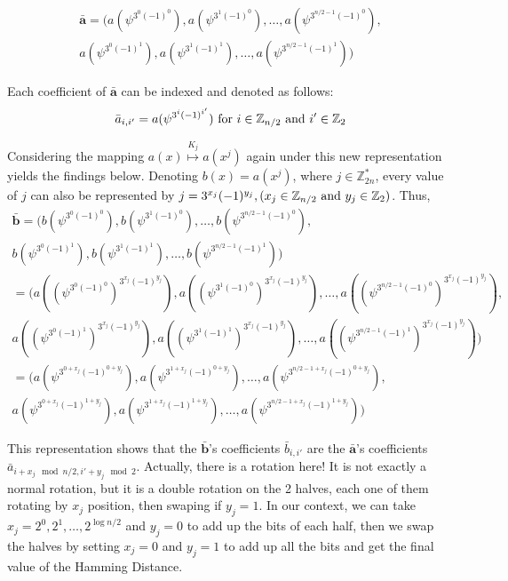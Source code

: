 \begin{description}
  \begin{align*}
       \mathbf{\bar{a}} = (a(\psi^{3^{0}(-1)^{0}}),a(\psi^{3^{1}(-1)^{0}}), \dots,
    a(\psi^{3^{n/2 -1}(-1)^{0}}), \\ a(\psi^{3^{0}(-1)^{1}}),
    a(\psi^{3^{1}(-1)^{1}}), \dots,a(\psi^{3^{n/2 -1}(-1)^{1}}))
  \end{align*}

  Each coefficient of \(\mathbf{\bar{a}}\) can be indexed and denoted as follows:
  \[
    \bar{a}_{i,i'} = a(\psi^{3^{i}(-1)^{i'}}) \textnormal{ for } i \in
    \mathbb{Z}_{n/2} \textnormal{ and } i' \in \mathbb{Z}_{2}
  \]

  Considering the mapping \(a(x) \stackrel{K_{j}}{\mapsto} a(x^{j})\) again under this new
  representation yields the findings below. Denoting \(b(x) = a(x^{j})\), where
  \(j \in \mathbb{Z}_{2n}^{*}\), every value of \(j\) can also be
  represented by
  \(j = 3^{x_{j}}(-1)^{y_{j}}, (x_{j} \in \mathbb{Z}_{n/2} \textnormal{ and }
  y_{j} \in \mathbb{Z}_{2})\). Thus,
  \begin{align*}
    \mathbf{\bar{b}} = (b(\psi^{3^{0}(-1)^{0}}),b(\psi^{3^{1}(-1)^{0}}), \dots,
    b(\psi^{3^{n/2 -1}(-1)^{0}}), \\ b(\psi^{3^{0}(-1)^{1}}),
    b(\psi^{3^{1}(-1)^{1}}), \dots,b(\psi^{3^{n/2 -1}(-1)^{1}}))\\
    = (a((\psi^{3^{0}(-1)^{0}})^{3^{x_{j}}(-1)^{y_{j}}}),a((\psi^{3^{1}(-1)^{0}})^{3^{x_{j}}(-1)^{y_{j}}}), \dots,
    a((\psi^{3^{n/2 -1}(-1)^{0}})^{3^{x_{j}}(-1)^{y_{j}}}), \\ a((\psi^{3^{0}(-1)^{1}})^{3^{x_{j}}(-1)^{y_{j}}}),
    a((\psi^{3^{1}(-1)^{1}})^{3^{x_{j}}(-1)^{y_{j}}}), \dots,a((\psi^{3^{n/2 -1}(-1)^{1}})^{3^{x_{j}}(-1)^{y_{j}}}))\\
    = (a(\psi^{3^{0 + x_{j}}(-1)^{0 + y_{j}}}), a(\psi^{3^{1 + x_{j}}(-1)^{0 + y_{j}}}), \dots,a(\psi^{3^{n/2 - 1 + x_{j}}(-1)^{0 + y_{j}}}),\\
    a(\psi^{3^{0 + x_{j}}(-1)^{1 + y_{j}}}), a(\psi^{3^{1 + x_{j}}(-1)^{1 + y_{j}}}), \dots, a(\psi^{3^{n/2 - 1 + x_{j}}(-1)^{1 + y_{j}}}))
  \end{align*}

  This representation shows that the \(\mathbf{\bar{b}}\)'s coefficients
  \(\bar{b}_{i,i'}\) are the \(\mathbf{\bar{a}}\)'s coefficients\\
  \(\bar{a}_{i+x_{j} \mod n/2, i' + y_{j} \mod 2}\). Actually, there is a
  rotation here! It is not exactly a normal rotation, but it is a double rotation on
  the 2 halves, each one of them rotating by \(x_{j}\) position, then swaping
  if \(y_{j} = 1\). In our context, we can take
  \(x_{j} = 2^{0}, 2^{1}, \dots, 2^{\log n/2}\) and \(y_{j} = 0\) to add up the
  bits of each half, then we swap the halves by setting \(x_{j} = 0\) and
  \(y_{j} = 1\) to add up all the bits and get the final value of the Hamming
  Distance.
  

\end{description}
